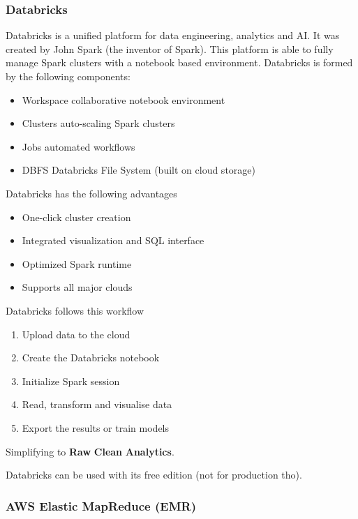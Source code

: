 \subsubsection{Databricks}

Databricks is a unified platform for data engineering, analytics and AI. It was created by John Spark (the inventor of Spark). This platform is able to fully manage Spark clusters with a notebook based environment. Databricks is formed by the following components:

\begin{itemize}
    \item Workspace \ra collaborative notebook environment
    \item Clusters \ra auto-scaling Spark clusters
    \item Jobs \ra automated workflows
    \item DBFS \ra Databricks File System (built on cloud storage)
\end{itemize}

Databricks has the following advantages

\begin{itemize}
    \item One-click cluster creation
    \item Integrated visualization and SQL interface
    \item Optimized Spark runtime
    \item Supports all major clouds
\end{itemize}

Databricks follows this workflow
\begin{enumerate}
    \item Upload data to the cloud
    \item Create the Databricks notebook
    \item Initialize Spark session
    \item Read, transform and visualise data
    \item Export the results or train models
\end{enumerate}

Simplifying to \textbf{Raw} \ra \textbf{Clean} \ra \textbf{Analytics}.

\vspace{10pt}

Databricks can be used with its free edition (not for production tho).



\subsubsection{AWS Elastic MapReduce (EMR)}

